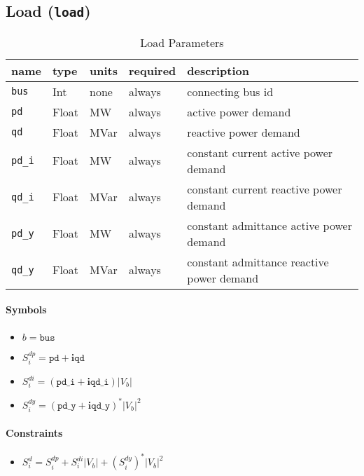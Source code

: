 \documentclass{article}
\begin{document}
\subsection{Load (\texttt{load})}

\begin{table}[h]
\centering
\caption{Load Parameters}
\begin{tabular}{|l|l|l|l|p{7cm}|}
\hline
name & type & units & required & description \\ 
\hline
\hline
\texttt{bus} & Int & none & always & connecting bus id \\ 
\hline
\texttt{pd} & Float & MW & always & active power demand  \\ 
\hline
\texttt{qd} & Float & MVar & always & reactive power demand  \\ 
\hline
\texttt{pd\_i} & Float & MW & always & constant current active power demand  \\ 
\hline
\texttt{qd\_i} & Float & MVar & always & constant current reactive power demand  \\ 
\hline
\texttt{pd\_y} & Float & MW & always & constant admittance active power demand  \\ 
\hline
\texttt{qd\_y} & Float & MVar & always & constant admittance reactive power demand  \\ 
\hline
\end{tabular}
\label{tbl:load}
\end{table}

\paragraph{Symbols}
\begin{itemize}
    \item $b = \texttt{bus}$
    \item $S^{dp}_i = \texttt{pd} + \bm i \texttt{qd}$
    \item $S^{di}_i = (\texttt{pd\_i} + \bm i  \texttt{qd\_i})|V_b|$
    \item $S^{dy}_i = (\texttt{pd\_y} + \bm i \texttt{qd\_y})^*|V_b|^2$
\end{itemize}

\paragraph{Constraints}
\begin{itemize}
    \item $S^d_i = S^{dp}_i + S^{di}_i |V_b| + (S^{dy}_i)^* |V_b|^2$
\end{itemize}
\end{document}
